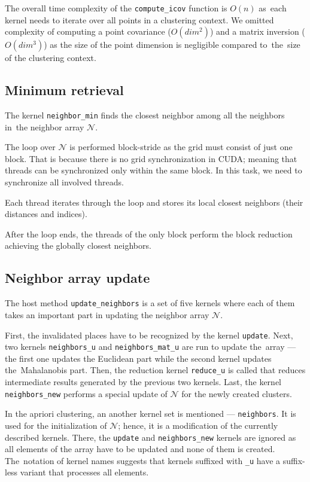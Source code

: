 \begin{rem}
The overall time complexity of the \texttt{compute\_icov} function is $O(n)$ as~each kernel needs to iterate over all points in a clustering context. We omitted complexity of computing a point covariance ($O(dim^2)$) and a matrix inversion ($O(dim^3)$) as the size of the point dimension is negligible compared to~the~size of the clustering context.
\end{rem}

\subsection{Minimum retrieval}

The kernel \texttt{neighbor\_min} finds the closest neighbor among all the neighbors in~the neighbor array $\mathcal{N}$.

The loop over $\mathcal{N}$ is performed block-stride as the grid must consist of just one block. That is because there is no grid synchronization in CUDA; meaning that threads can be synchronized only within the same block. In this task, we need to synchronize all involved threads.

Each thread iterates through the loop and stores its local closest neighbors (their distances and indices).

After the loop ends, the threads of the only block perform the block reduction achieving the globally closest neighbors.

\subsection{Neighbor array update}


The host method \texttt{update\_neighbors} is a set of five kernels where each of them takes an important part in updating the neighbor array $\mathcal{N}$.

First, the invalidated places have to be recognized by the kernel \texttt{update}. Next, two kernels \texttt{neighbors\_u} and \texttt{neighbors\_mat\_u} are run to update the~array --- the first one updates the Euclidean part while the second kernel updates the~Mahalanobis part. Then, the reduction kernel \texttt{reduce\_u} is called that reduces intermediate results generated by the previous two kernels. Last, the kernel \texttt{neighbors\_new} performs a special update of $\mathcal{N}$ for the newly created clusters.

In the apriori clustering, an another kernel set is mentioned ---  \texttt{neighbors}. It is used for the initialization of $\mathcal{N}$; hence, it is a modification of the currently described kernels. There, the \texttt{update} and \texttt{neighbors\_new} kernels are ignored as all elements of the array have to be updated and none of them is created. The~notation of kernel names suggests that kernels suffixed with \texttt{\_u} have a suffix-less variant that processes all elements.

